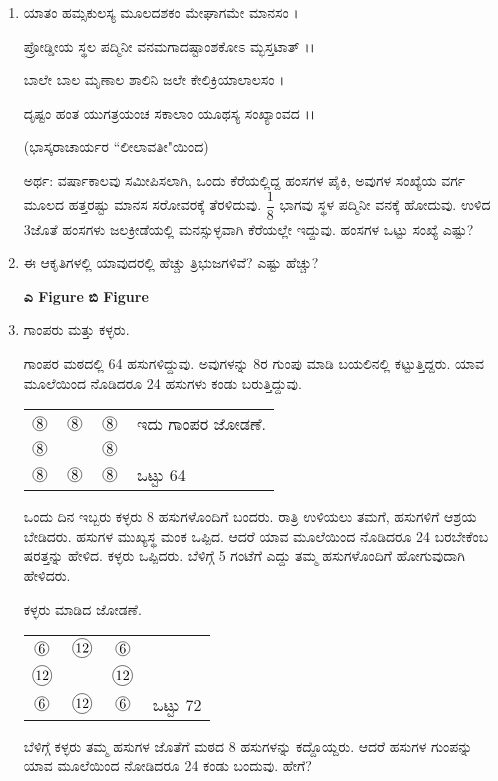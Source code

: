 \begin{enumerate}
\item ಯಾತಂ ಹಮ್ಸಕುಲಸ್ಯ ಮೂಲದಶಕಂ ಮೇಘಾಗಮೇ ಮಾನಸಂ ।

ಪ್ರೋಡ್ಡೀಯ ಸ್ಥಲ ಪದ್ಮಿನೀ ವನಮಗಾದಷ್ಟಾಂಶಕೋಽ ಮ್ಭಸ್ತಟಾತ್ ।।

ಬಾಲೇ ಬಾಲ ಮೃಣಾಲ ಶಾಲಿನಿ ಜಲೇ ಕೇಲಿಕ್ರಿಯಾಲಾಲಸಂ ।

ದೃಷ್ಟಂ ಹಂತ ಯುಗತ್ರಯಂಚ ಸಕಾಲಾಂ ಯೂಥಸ್ಯ ಸಂಖ್ಯಾಂವದ ।।

\hfill (ಭಾಸ್ಕರಾಚಾರ್ಯರ ``ಲೀಲಾವತೀ"ಯಿಂದ)


ಅರ್ಥ: ವರ್ಷಾಕಾಲವು ಸಮೀಪಿಸಲಾಗಿ, ಒಂದು ಕೆರೆಯಲ್ಲಿದ್ದ ಹಂಸಗಳ ಪೈಕಿ, ಅವುಗಳ ಸಂಖ್ಯೆಯ ವರ್ಗ ಮೂಲದ ಹತ್ತರಷ್ಟು ಮಾನಸ ಸರೋವರಕ್ಕೆ ತೆರಳಿದುವು. $\dfrac{1}{8}$ ಭಾಗವು ಸ್ಥಳ ಪದ್ಮಿನೀ ವನಕ್ಕೆ ಹೋದುವು. ಉಳಿದ 3ಜೊತೆ ಹಂಸಗಳು ಜಲಕ್ರೀಡೆಯಲ್ಲಿ ಮನಸ್ಸುಳ್ಳವಾಗಿ ಕೆರೆಯಲ್ಲೇ ಇದ್ದುವು. ಹಂಸಗಳ ಒಟ್ಟು ಸಂಖ್ಯೆ ಎಷ್ಟು? 

\item ಈ ಆಕೃತಿಗಳಲ್ಲಿ ಯಾವುದರಲ್ಲಿ ಹೆಚ್ಚು ತ್ರಿಭುಜಗಳಿವೆ? ಎಷ್ಟು ಹೆಚ್ಚು?
\begin{center}
{\bf ಎ Figure}
{\bf ಬಿ Figure}
\end{center}

\item ಗಾಂಪರು ಮತ್ತು ಕಳ್ಳರು. 

ಗಾಂಪರ ಮಠದಲ್ಲಿ 64 ಹಸುಗಳಿದ್ದುವು. ಅವುಗಳನ್ನು 8ರ ಗುಂಪು ಮಾಡಿ ಬಯಲಿನಲ್ಲಿ ಕಟ್ಟುತ್ತಿದ್ದರು. ಯಾವ ಮೂಲೆಯಿಂದ ನೊಡಿದರೂ 24 ಹಸುಗಳು ಕಂಡು ಬರುತ್ತಿದ್ದುವು. 

\begin{tabular}[t]{cccl}
$\mycirc{8}$ & $\mycirc{8}$ & $\mycirc{8}$ & ಇದು ಗಾಂಪರ ಜೋಡಣೆ. \\
$\mycirc{8}$ & & $\mycirc{8}$ &\\
$\mycirc{8}$ & $\mycirc{8}$ & $\mycirc{8}$ & ಒಟ್ಟು 64
\end{tabular}

ಒಂದು ದಿನ ಇಬ್ಬರು ಕಳ್ಳರು 8 ಹಸುಗಳೊಂದಿಗೆ ಬಂದರು. ರಾತ್ರಿ ಉಳಿಯಲು ತಮಗೆ, ಹಸುಗಳಿಗೆ ಆಶ್ರಯ ಬೇಡಿದರು. ಹಸುಗಳ ಮುಖ್ಯಸ್ಥ ಮಂಕ ಒಪ್ಪಿದ. ಆದರೆ ಯಾವ ಮೂಲೆಯಿಂದ ನೊಡಿದರೂ 24 ಬರಬೇಕೆಂಬ ಷರತ್ತನ್ನು ಹೇಳಿದ. ಕಳ್ಳರು ಒಪ್ಪಿದರು. ಬೆಳಿಗ್ಗೆ  5 ಗಂಟೆಗೆ ಎದ್ದು ತಮ್ಮ ಹಸುಗಳೊಂದಿಗೆ ಹೋಗುವುದಾಗಿ ಹೇಳಿದರು. 

ಕಳ್ಳರು ಮಾಡಿದ ಜೋಡಣೆ. 

\begin{tabular}[t]{cccl}
$\mycirc{6}$ & $\mycirc{12}$ & $\mycirc{6}$ & \\
$\mycirc{12}$ & & $\mycirc{12}$ &\\
$\mycirc{6}$ & $\mycirc{12}$ & $\mycirc{6}$ & ಒಟ್ಟು 72
\end{tabular}

ಬೆಳಿಗ್ಗೆ ಕಳ್ಳರು ತಮ್ಮ ಹಸುಗಳ ಜೊತೆಗೆ ಮಠದ 8 ಹಸುಗಳನ್ನು ಕದ್ದೊಯ್ದರು. ಆದರೆ ಹಸುಗಳ ಗುಂಪನ್ನು ಯಾವ ಮೂಲೆಯಿಂದ ನೋಡಿದರೂ 24 ಕಂಡು ಬಂದುವು. ಹೇಗೆ? 


\end{enumerate}
